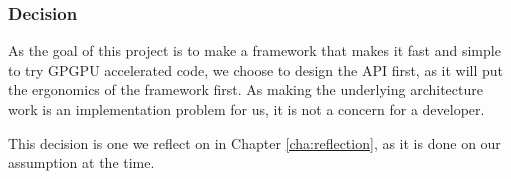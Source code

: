 %
%

\subsubsection{Decision}
As the goal of this project is to make a framework that makes it fast and simple to try GPGPU accelerated code, we choose to design the API first, as it will put the ergonomics of the framework first. As making the underlying architecture work is an implementation problem for us, it is not a concern for a developer.

This decision is one we reflect on in Chapter \ref{cha:reflection}, as it is done on our assumption at the time.
